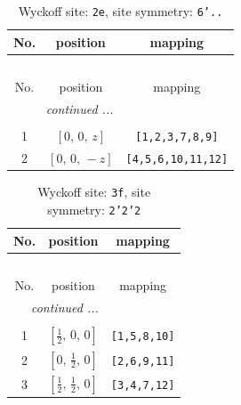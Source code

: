 \documentclass[fleqn,8pt]{jsarticle}
\begin{document}
\begin{longtable}{ccc}
\caption{Wyckoff site: {\tt 2e}, site symmetry: {\tt 6'..}}
 \\
 \hline \hline
No. & position & mapping \\ \hline \endfirsthead

\multicolumn{2}{l}{\tablename\ \thetable{}} \\
 \hline \hline
No. & position & mapping \\ \hline \endhead

 \hline \hline
\multicolumn{2}{r}{\footnotesize\it continued ...} \\ \endfoot

 \hline \hline
\multicolumn{2}{r}{} \\ \endlastfoot

1 & $\left[ 0,\, 0,\, z \right]$ & {\tt [1,2,3,7,8,9]} \\ \hline
2 & $\left[ 0,\, 0,\, - z \right]$ & {\tt [4,5,6,10,11,12]} \\
\end{longtable}
\renewcommand{\arraystretch}{1.2}
\begin{longtable}{ccc}
\caption{Wyckoff site: {\tt 3f}, site symmetry: {\tt 2'2'2}}
 \\
 \hline \hline
No. & position & mapping \\ \hline \endfirsthead

\multicolumn{2}{l}{\tablename\ \thetable{}} \\
 \hline \hline
No. & position & mapping \\ \hline \endhead

 \hline \hline
\multicolumn{2}{r}{\footnotesize\it continued ...} \\ \endfoot

 \hline \hline
\multicolumn{2}{r}{} \\ \endlastfoot

1 & $\left[ \frac{1}{2},\, 0,\, 0 \right]$ & {\tt [1,5,8,10]} \\ \hline
2 & $\left[ 0,\, \frac{1}{2},\, 0 \right]$ & {\tt [2,6,9,11]} \\ \hline
3 & $\left[ \frac{1}{2},\, \frac{1}{2},\, 0 \right]$ & {\tt [3,4,7,12]} \\
\end{longtable}
\renewcommand{\arraystretch}{1.2}
\end{document}
